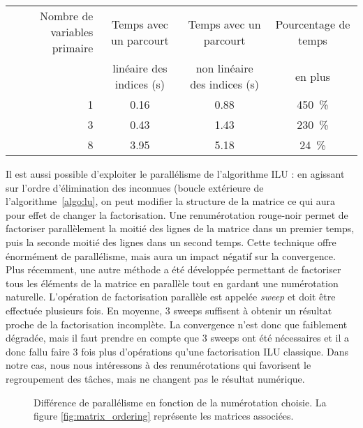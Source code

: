 \begin{center}
  \begin{tabular}{|r|c|c|c|}
    \hline
    Nombre de variables primaire & Temps avec un parcourt & Temps avec un parcourt & Pourcentage de temps\\
    & linéaire des indices (s) & non linéaire des indices (s) & en plus \\
    \hline
    1 & 0.16 & 0.88 & 450~\% \\
    \hline
    3 & 0.43 & 1.43 & 230~\% \\
    \hline
    8 & 3.95 & 5.18 & 24~\% \\
    \hline
  \end{tabular}
  \label{tab:facto_order}
\end{center}


Il est aussi possible d'exploiter le parallélisme de l'algorithme ILU :
%
en agissant sur l'ordre d'élimination des inconnues (boucle extérieure de l'algorithme~\ref{algo:lu}, on peut modifier la structure de la matrice ce qui aura pour effet de changer la factorisation.
%
Une renumérotation rouge-noir permet de factoriser parallèlement la moitié des lignes de la matrice dans un premier temps, puis la seconde moitié des lignes dans un second temps.
%
Cette technique offre énormément de parallélisme, mais aura un impact négatif sur la convergence\cite{red_black_ilu}.
%
Plus récemment, une autre méthode a été développée permettant de factoriser tous les éléments de la matrice en parallèle tout en gardant une numérotation naturelle.
%
L'opération de factorisation parallèle est appelée {\em sweep} et doit être effectuée plusieurs fois\cite{chow2014fine}.
%
En moyenne, 3 sweeps suffisent à obtenir un résultat proche de la factorisation incomplète.
%
La convergence n'est donc que faiblement dégradée, mais il faut prendre en compte que 3 sweeps ont été nécessaires et il a donc fallu faire 3 fois plus d'opérations qu'une factorisation ILU classique.
%
Dans notre cas, nous nous intéressons à des renumérotations qui favorisent le regroupement des tâches, mais ne changent pas le résultat numérique.

\begin{figure}[!h]
     \begin{center}
    \end{center}
    \caption{Différence de parallélisme en fonction de la numérotation choisie. La figure \ref{fig:matrix_ordering} représente les matrices associées.}
    \label{fig:DAG_ordering}
\end{figure}
